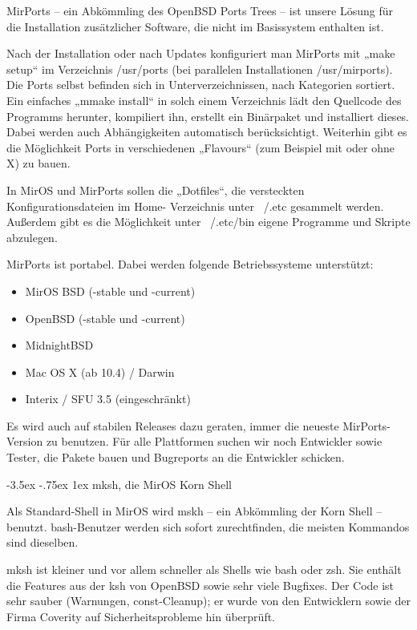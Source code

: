 \documentclass[
a4paper,landscape,11pt,%
notumble%
]{leaflet}
\makeatletter
\newcommand{\sectbox}[1]{%
 \noindent\protect\colorbox{yellow}{%
 \@tempdima=\hsize
 \advance\@tempdima by-2\fboxsep
 \advance\@tempdima by-2\fboxrule
 \protect\parbox{\@tempdima}{%
 \medskip
 \raggedright %
 #1 \medskip
}}}
\renewcommand\section{\@startsection{section}{1}{0.9em}%
  {-3.5ex \@plus -.75ex}%
  {1ex} %
  {\normalfont\Large\itshape\sectbox}}
\makeatother
\begin{document}
MirPorts -- ein Abkömmling des OpenBSD Ports Trees -- ist unsere Lösung für die Installation zusätzlicher Software, die nicht im Basissystem enthalten ist.

Nach der Installation oder nach Updates konfiguriert man MirPorts mit „make setup“ im Verzeichnis /usr/ports (bei parallelen Installationen /usr/mirports). Die Ports selbst befinden sich in Unterverzeichnissen, nach Kategorien sortiert. Ein einfaches „mmake install“ in solch einem Verzeichnis lädt den Quellcode des Programms herunter, kompiliert ihn, erstellt ein Binärpaket und installiert dieses. Dabei werden auch Abhängigkeiten automatisch berücksichtigt. Weiterhin gibt es die Möglichkeit Ports in verschiedenen „Flavours“ (zum Beispiel mit oder ohne X) zu bauen.

In MirOS und MirPorts sollen die „Dotfiles“, die versteckten Konfigurationsdateien im Home- Verzeichnis unter ~/.etc gesammelt werden. Außerdem gibt es die Möglichkeit unter ~/.etc/bin eigene Programme und Skripte abzulegen.

MirPorts ist portabel. Dabei werden folgende Betriebssysteme unterstützt:

\begin{itemize}
\item MirOS BSD (-stable und -current)
\item OpenBSD (-stable und -current)
\item MidnightBSD
\item Mac OS X (ab 10.4) / Darwin
\item Interix / SFU 3.5 (eingeschränkt)
\end{itemize}

Es wird auch auf stabilen Releases dazu geraten, immer die neueste MirPorts-Version zu benutzen. Für alle Plattformen suchen wir noch Entwickler sowie Tester, die Pakete bauen und Bugreports an die Entwickler schicken.

\newpage

\section{mksh, die MirOS Korn Shell}

Als Standard-Shell in MirOS wird mskh – ein Abkömmling der Korn Shell – benutzt. bash-Benutzer werden sich sofort zurechtfinden, die meisten Kommandos sind dieselben.

mksh ist kleiner und vor allem schneller als Shells wie bash oder zsh. Sie enthält die Features aus der ksh von OpenBSD sowie sehr viele Bugfixes. Der Code ist sehr sauber (Warnungen, const-Cleanup); er wurde von den Entwicklern sowie der Firma Coverity auf Sicherheitsprobleme hin überprüft.
\end{document}
